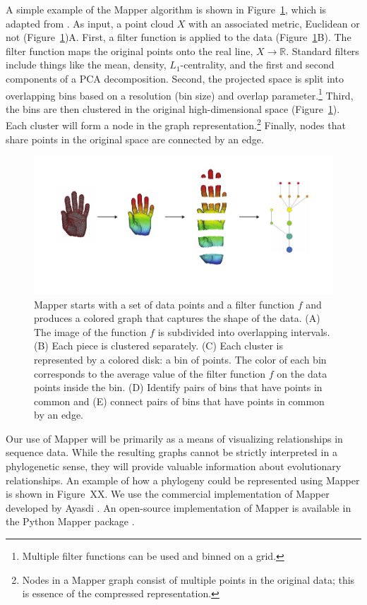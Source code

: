 A simple example of the Mapper algorithm is shown in Figure~\ref{fig:bg:mapper}, which is adapted from \cite{Lum:2013cz}.
As input, a point cloud $X$ with an associated metric, Euclidean or not (Figure~\ref{fig:bg:mapper})A.
First, a filter function is applied to the data (Figure~\ref{fig:bg:mapper}B).
The filter function maps the original points onto the real line, $X\rightarrow\mathbb{R}$.
Standard filters include things like the mean, density, $L_1$-centrality, and the first and second components of a PCA decomposition.
Second, the projected space is split into overlapping bins based on a resolution (bin size) and overlap parameter.\footnote{Multiple filter functions can be used and binned on a grid.}
Third, the bins are then clustered in the original high-dimensional space (Figure~\ref{fig:bg:mapper}).
Each cluster will form a node in the graph representation.\footnote{Nodes in a Mapper graph consist of multiple points in the original data; this is essence of the compressed representation.}
Finally, nodes that share points in the original space are connected by an edge.

\begin{figure}
	\centering
	\includegraphics[]{fig/background/mapper.pdf}
	\caption[The Mapper Algorithm]{Mapper starts with a set of data points and a filter function $f$ and produces a colored graph that captures the shape of the data. (A) The image of the function $f$ is subdivided into overlapping intervals. (B) Each piece is clustered separately. (C) Each cluster is represented by a colored disk: a bin of points. The color of each bin corresponds to the average value of the filter function $f$ on the data points inside the bin. (D) Identify pairs of bins that have points in common and (E) connect pairs of bins that have points in common by an edge.}
	\label{fig:bg:mapper}
\end{figure}

Our use of Mapper will be primarily as a means of visualizing relationships in sequence data.
While the resulting graphs cannot be strictly interpreted in a phylogenetic sense, they will provide valuable information about evolutionary relationships.
An example of how a phylogeny could be represented using Mapper is shown in Figure~XX.
We use the commercial implementation of Mapper developed by Ayasdi \cite{AyasdiIris:2015}.
An open-source implementation of Mapper is available in the Python Mapper package \cite{Mullner:2013}.

